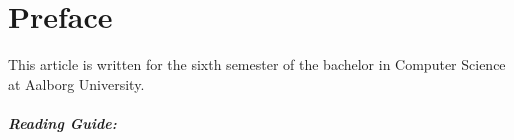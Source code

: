 \chapter*{Preface}\label{ch:preface}
This article is written for the sixth semester of the bachelor in Computer Science at Aalborg University. 

\paragraph{Reading Guide:}
 
